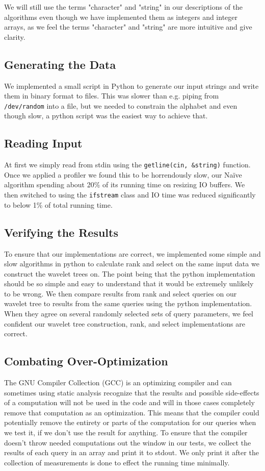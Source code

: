 We will still use the terms "character" and "string" in our descriptions of the algorithms even though we have implemented them as integers and integer arrays, as we feel the terms "character" and "string" are more intuitive and give clarity.


\subsection{Generating the Data}
We implemented a small script in Python to generate our input strings and write them in binary format to files.
This was slower than e.g. piping from \texttt{/dev/random} into a file, but we needed to constrain the alphabet and even though slow, a python script was the easiest way to achieve that.

\subsection{Reading Input}
At first we simply read from stdin using the \texttt{getline(cin, \&string)} function. 
Once we applied a profiler we found this to be horrendously slow, our Naïve algorithm spending about 20\% of its running time on resizing IO buffers. 
We then switched to using the \texttt{ifstream} class and IO time was reduced significantly to below 1\% of total running time.

\subsection{Verifying the Results}
To ensure that our implementations are correct, we implemented some simple and slow algorithms in python to calculate rank and select on the same input data we construct the wavelet trees on.
The point being that the python implementation should be so simple and easy to understand that it would be extremely unlikely to be wrong.
We then compare results from rank and select queries on our wavelet tree to results from the same queries using the python implementation.
When they agree on several randomly selected sets of query parameters, we feel confident our wavelet tree construction, rank, and select implementations are correct.

\subsection{Combating Over-Optimization}
The GNU Compiler Collection (GCC) is an optimizing compiler and can sometimes using static analysis recognize that the results and possible side-effects of a computation will not be used in the code and will in those cases completely remove that computation as an optimization.
This means that the compiler could potentially remove the entirety or parts of the computation for our queries when we test it, if we don't use the result for anything.
To ensure that the compiler doesn't throw needed computations out the window in our tests, we collect the results of each query in an array and print it to stdout. We only print it after the collection of measurements is done to effect the running time minimally.

